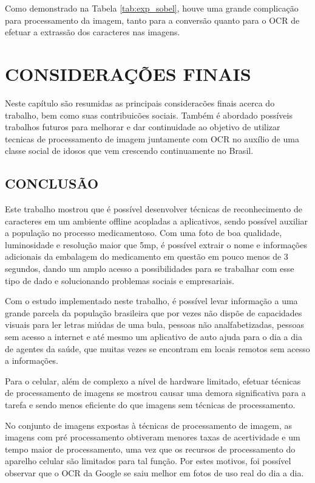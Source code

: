 Como demonstrado na Tabela \ref{tab:exp_sobel}, houve uma grande complicação para processamento da imagem, tanto para a conversão quanto para o OCR de efetuar a extrassão dos caracteres nas imagens.

\chapter{CONSIDERAÇÕES FINAIS}\label{ch:intro}
Neste capítulo são resumidas as principais consideracões finais acerca do trabalho, bem como suas contribuicões sociais. Também é abordado possíveis trabalhos futuros para melhorar e dar continuidade ao objetivo de utilizar tecnicas de processamento de imagem juntamente com OCR no auxílio de uma classe social de idosos que vem crescendo continuamente no Brasil.


\section{CONCLUSÃO}

Este trabalho mostrou que é possível desenvolver técnicas de reconhecimento de caracteres em um ambiente offline acopladas a aplicativos, sendo possível auxiliar a população no processo medicamentoso. Com uma foto de boa qualidade, luminosidade e resolução maior que 5mp, é possível extrair o nome e informações adicionais da embalagem do medicamento em questão em pouco menos de 3 segundos, dando um amplo acesso a possibilidades para se trabalhar com esse tipo de dado e solucionando problemas sociais e empresariais.

Com o estudo implementado neste trabalho, é possível levar informação a uma grande parcela da população brasileira que por vezes não dispõe de capacidades visuais para ler letras miúdas de uma bula, pessoas não analfabetizadas, pessoas sem acesso a internet e até mesmo um aplicativo de auto ajuda para o dia a dia de agentes da saúde, que muitas vezes se encontram em locais remotos sem acesso a informações.  

Para o celular, além de complexo a nível de hardware limitado, efetuar técnicas de processamento de imagens se mostrou causar uma demora significativa para a tarefa e sendo menos eficiente do que imagens sem técnicas de processamento.

No conjunto de imagens expostas à técnicas de processamento de imagem, as imagens com pré processamento obtiveram menores taxas de acertividade e um tempo maior de processamento, uma vez que os recursos de processamento do aparelho celular são limitados para tal função. Por estes motivos, foi possível observar que o OCR da Google se saiu melhor em fotos de uso real do dia a dia.


